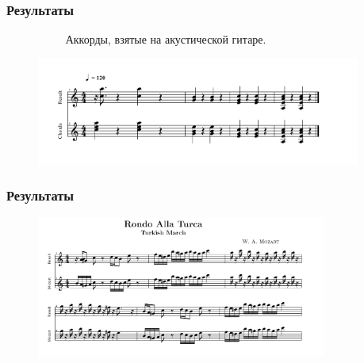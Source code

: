 \documentclass[11pt,slides,aspectratio=43]{beamer}%
\begin{document}
\section{}
    \begin{frame}
    \frametitle{Результаты}
               ~~~~~~~~~~ Аккорды, взятые на акустической гитаре.
	   \begin{figure}[h!]
            \begin{center}
                \includegraphics[width = 0.95\textwidth]{Am_chords_-_compare-001.png}

            \end{center}

        \end{figure}
	\end{frame}

    \begin{frame}
	\frametitle{Результаты}
	   \begin{figure}[h!]
            \begin{center}
                \includegraphics[width = 0.85\textwidth]{turca.png}
            \end{center}

        \end{figure}
	\end{frame}
\end{document}
